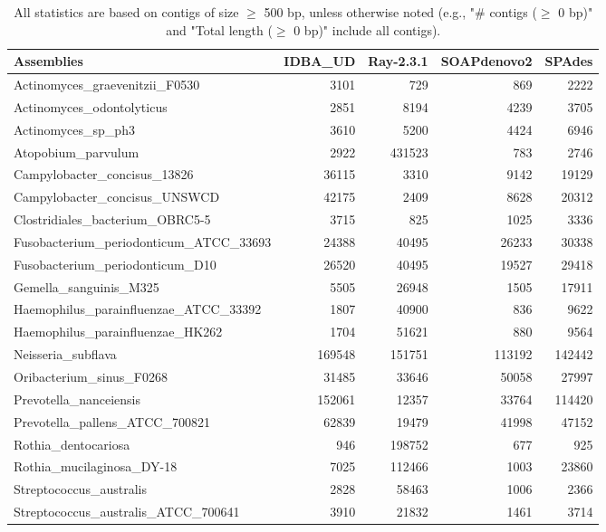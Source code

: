 \documentclass[12pt,a4paper]{article}
\begin{document}
\begin{table}[ht]
\begin{center}
\caption{All statistics are based on contigs of size $\geq$ 500 bp, unless otherwise noted (e.g., "\# contigs ($\geq$ 0 bp)" and "Total length ($\geq$ 0 bp)" include all contigs).}
\begin{tabular}{|l*{4}{|r}|}
\hline
Assemblies & IDBA\_UD & Ray-2.3.1 & SOAPdenovo2 & SPAdes \\ \hline
Actinomyces\_graevenitzii\_F0530 & 3101 & 729 & 869 & 2222 \\ \hline
Actinomyces\_odontolyticus & 2851 & 8194 & 4239 & 3705 \\ \hline
Actinomyces\_sp\_ph3 & 3610 & 5200 & 4424 & 6946 \\ \hline
Atopobium\_parvulum & 2922 & 431523 & 783 & 2746 \\ \hline
Campylobacter\_concisus\_13826 & 36115 & 3310 & 9142 & 19129 \\ \hline
Campylobacter\_concisus\_UNSWCD & 42175 & 2409 & 8628 & 20312 \\ \hline
Clostridiales\_bacterium\_OBRC5-5 & 3715 & 825 & 1025 & 3336 \\ \hline
Fusobacterium\_periodonticum\_ATCC\_33693 & 24388 & 40495 & 26233 & 30338 \\ \hline
Fusobacterium\_periodonticum\_D10 & 26520 & 40495 & 19527 & 29418 \\ \hline
Gemella\_sanguinis\_M325 & 5505 & 26948 & 1505 & 17911 \\ \hline
Haemophilus\_parainfluenzae\_ATCC\_33392 & 1807 & 40900 & 836 & 9622 \\ \hline
Haemophilus\_parainfluenzae\_HK262 & 1704 & 51621 & 880 & 9564 \\ \hline
Neisseria\_subflava & 169548 & 151751 & 113192 & 142442 \\ \hline
Oribacterium\_sinus\_F0268 & 31485 & 33646 & 50058 & 27997 \\ \hline
Prevotella\_nanceiensis & 152061 & 12357 & 33764 & 114420 \\ \hline
Prevotella\_pallens\_ATCC\_700821 & 62839 & 19479 & 41998 & 47152 \\ \hline
Rothia\_dentocariosa & 946 & 198752 & 677 & 925 \\ \hline
Rothia\_mucilaginosa\_DY-18 & 7025 & 112466 & 1003 & 23860 \\ \hline
Streptococcus\_australis & 2828 & 58463 & 1006 & 2366 \\ \hline
Streptococcus\_australis\_ATCC\_700641 & 3910 & 21832 & 1461 & 3714 \\ \hline

\end{tabular}
\end{center}
\end{table}
\end{document}
